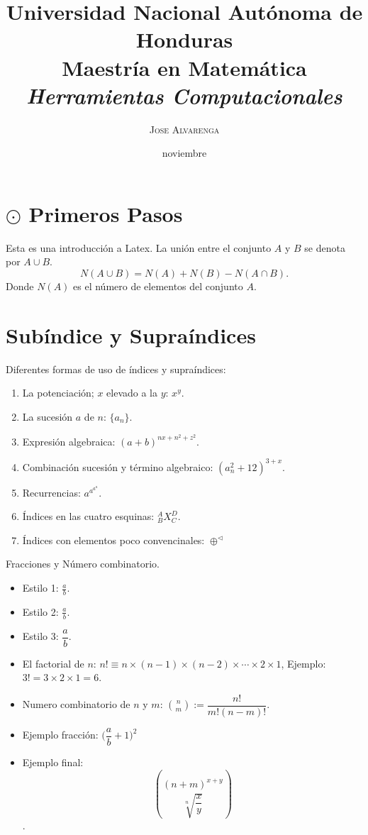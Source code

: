 \documentclass[12pt,letterpaper]{article}
\author{\textsc{Jose Alvarenga}}
\title{\Huge Universidad Nacional Autónoma de Honduras\\ \Large \textbf{Maestría en Matemática}
\\ \normalsize \textit{Herramientas Computacionales}}
\begin{document}
\date{noviembre}
\maketitle
\section*{$\odot$ Primeros Pasos}
Esta es una introducción a Latex. La unión entre el conjunto $A$ y $B$ se denota por $A\cup B$.
\begin{displaymath}
N(A\cup B)=N(A)+N(B)-N(A\cap B).
\end{displaymath}
Donde $N(A)$ es el número de elementos del conjunto $A$. 
\section{Subíndice y Supraíndices}
Diferentes formas de uso de índices y supraíndices:
\begin{enumerate}
\item La potenciación; $x$ elevado a la $y$: $x^y$. 
\item La sucesión $a$ de $n$: $\{a_n\}$. 
\item Expresión algebraica: $(a+b)^{nx+n^2+z^2}$.
\item Combinación sucesión y término algebraico: $(a_n^2+12)^{3+x}$.
\item Recurrencias: $a^{a^{a^a}}$.
\item Índices en las cuatro esquinas: $^{A}_{B}X_{C}^{D}$.
\item Índices con elementos poco convencinales: $\oplus^{\lhd}$
\end{enumerate}
\newpage
Fracciones y Número combinatorio. 
\begin{itemize}
\item Estilo 1: $\frac{a}{b}.$
\item Estilo 2: $\displaystyle\frac{a}{b}.$
\item Estilo 3: $\dfrac{a}{b}.$
\item El factorial de $n$: $n!\equiv n\times(n-1)\times(n-2)\times\cdots \times 2\times 1$, Ejemplo: $3!=3\times 2\times 1=6$.
\item Numero combinatorio de $n$ y $m$: $\displaystyle\binom{n}{m}:=\dfrac{n!}{m!(n-m)!}$.
\item Ejemplo fracción: $\bigg(\dfrac{a}{b}+1\bigg)^2$
\item Ejemplo final: $$\displaystyle \binom{(n+m)^{x+y}}{\sqrt[n]{\dfrac{x}{y}}}$$.
\end{itemize}
\end{document}
